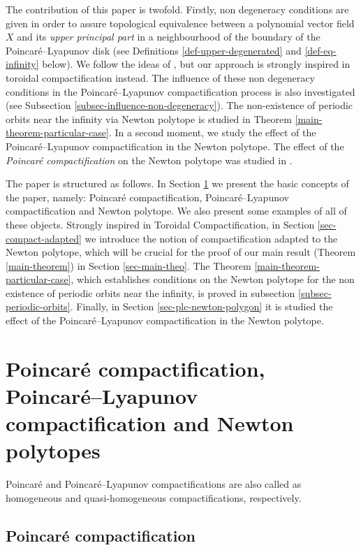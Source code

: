 \documentclass[12pt]{amsart}
\begin{document}
The contribution of this paper is twofold. Firstly, non degeneracy conditions are given in order to assure topological equivalence between a polynomial vector field $X$ and its \emph{upper principal part} in a neighbourhood of the boundary of the Poincaré--Lyapunov disk (see Definitions \ref{def-upper-degenerated} and \ref{def-eq-infinity} below). We follow the ideas of \cite{BrunellaMiari}, but our approach is strongly inspired in toroidal compactification \cite{Khovanskii1,Khovanskii2} instead. The influence of these non degeneracy conditions in the Poincaré--Lyapunov compactification process is also investigated (see Subsection \ref{subsec-influence-non-degeneracy}). The non-existence of periodic orbits near the infinity via Newton polytope is studied in Theorem \ref{main-theorem-particular-case}. In a second moment, we study the effect of the Poincaré--Lyapunov compactification in the Newton polytope. The effect of the \emph{Poincaré compactification} on the Newton polytope was studied in \cite{Berezovskaya2,Kappos}.

The paper is structured as follows. In Section \ref{sec-poincare-pl} we present the basic concepts of the paper, namely: Poincaré compactification, Poincaré--Lyapunov compactification and Newton polytope. We also present some examples of all of these objects. Strongly inspired in Toroidal Compactification, in Section \ref{sec-compact-adapted} we introduce the notion of compactification adapted to the Newton polytope, which will be crucial for the proof of our main result (Theorem \ref{main-theorem}) in Section \ref{sec-main-theo}. The Theorem \ref{main-theorem-particular-case}, which establishes  conditions on the Newton polytope for the non existence of periodic orbits near the infinity, is proved in subsection \ref{subsec-periodic-orbits}. Finally, in Section \ref{sec-plc-newton-polygon} it is studied the effect of the Poincaré--Lyapunov compactification in the Newton polytope.

\section{Poincaré compactification, Poincaré--Lyapunov compactification and Newton polytopes}\label{sec-poincare-pl}

Poincaré and Poincaré--Lyapunov compactifications are also called as homogeneous and quasi-homogeneous compactifications, respectively.

\subsection{Poincaré compactification}
\end{document}
